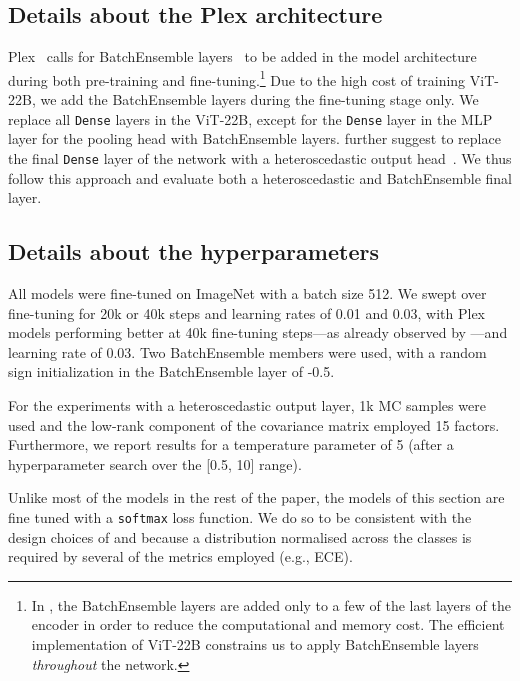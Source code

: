 \documentclass{article}
\begin{document}
\subsection{Details about the Plex architecture}

Plex~\citep{tran2022plex} calls for BatchEnsemble layers~\citep{wen2019batchensemble} to be added
in
the model architecture during both pre-training and fine-tuning.\footnote{In \citet{tran2022plex}, the BatchEnsemble layers are added only to a few of the last layers of the encoder in order to reduce the computational and memory cost. The efficient implementation of ViT-22B constrains us to apply BatchEnsemble layers \textit{throughout} the network.} Due to the high cost of training ViT-22B, we add the BatchEnsemble layers during the fine-tuning stage only. We replace all \texttt{Dense} layers in the ViT-22B, except for the \texttt{Dense} layer in the MLP layer for the pooling head with BatchEnsemble layers. \citet{tran2022plex} further suggest to replace the final \texttt{Dense} layer of the network with a heteroscedastic output head~\citep{collier2021correlated}. We thus follow this approach and evaluate both a heteroscedastic and BatchEnsemble final layer.

\subsection{Details about the hyperparameters}

All models were fine-tuned on ImageNet with a batch size 512. We swept over fine-tuning for 20k or 40k steps and learning rates of 0.01 and 0.03, with Plex models performing better at 40k fine-tuning steps---as already observed by \citet{tran2022plex}---and learning rate of 0.03. Two BatchEnsemble members were used, with a random sign initialization in the BatchEnsemble layer of -0.5.

For the experiments with a heteroscedastic output layer, 1k MC samples were used and the low-rank component of the covariance matrix employed 15 factors. Furthermore, we report results for a temperature parameter of 5 (after a hyperparameter search over the [0.5, 10] range).

Unlike most of the models in the rest of the paper, the models of this section are fine tuned with a \texttt{softmax} loss function. We do so to be consistent with the design choices of \citet{tran2022plex} and because a distribution normalised across the classes is required by several of the metrics employed (e.g., ECE). 
\end{document}
